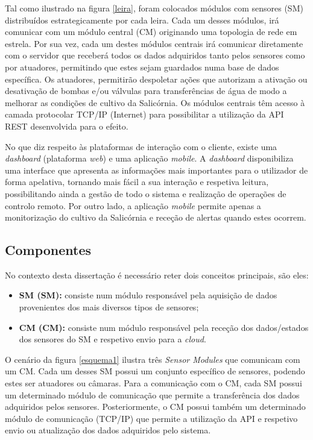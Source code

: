 Tal como ilustrado na figura \ref{leira}, foram colocados módulos com sensores (SM) distribuídos estrategicamente por cada leira. Cada um desses módulos, irá comunicar com um módulo central (CM) originando uma topologia de rede em estrela.  Por sua vez, cada um destes módulos centrais irá comunicar diretamente com o servidor que receberá todos os dados adquiridos tanto pelos sensores como por atuadores, permitindo que estes sejam guardados numa base de dados específica. Os atuadores, permitirão despoletar ações que autorizam a ativação ou desativação de bombas e/ou válvulas para transferências de água de modo a melhorar as condições de cultivo da Salicórnia. 
Os módulos centrais têm acesso à camada protocolar \ac{TCP}/\ac{IP} (Internet) para possibilitar a utilização da \acs{API} \acs{REST} desenvolvida para o efeito. 

No que diz respeito às plataformas de interação com o cliente, existe uma \textit{dashboard} (plataforma \textit{web}) e uma aplicação \textit{mobile}. A \textit{dashboard} disponibiliza uma interface que apresenta as informações mais importantes para o utilizador de forma apelativa, tornando mais fácil a sua interação e respetiva leitura, possibilitando ainda a gestão de todo o sistema e realização de operações de controlo remoto. Por outro lado, a aplicação \textit{mobile} permite apenas a monitorização do cultivo da Salicórnia e receção de alertas quando estes ocorrem.




\subsection{Componentes}

No contexto desta dissertação é necessário reter dois conceitos principais, são eles: 

\begin{itemize}
	\item \textbf{\acl{SM} (SM):} consiste num módulo responsável pela aquisição de dados provenientes dos mais diversos tipos de sensores; 
	
	
	\item \textbf{\acl{CM} (CM):} consiste num módulo responsável pela receção dos dados/estados dos sensores do \acl{SM} e respetivo envio para a \textit{cloud}.  
	
\end{itemize}


O cenário da figura \ref{esquema1} ilustra três \textit{Sensor Modules} que comunicam com um \acl{CM}. Cada um desses \acl{SM} possui um conjunto específico de sensores, podendo estes ser atuadores ou câmaras. Para a comunicação com o \acl{CM}, cada \acl{SM} possui um determinado módulo de comunicação que permite a transferência dos dados adquiridos pelos sensores. Posteriormente, o \acl{CM} possui também um determinado módulo de comunicação (\acs{TCP}/\acs{IP}) que permite a utilização da \ac{API} e respetivo envio ou atualização dos dados adquiridos pelo sistema. 



